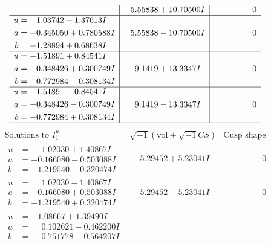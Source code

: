 \documentclass[1p]{elsarticle_modified}
\theoremstyle{definition}
\newcommand{\I}{\sqrt{-1}}
\begin{document}
$$\begin{array}{c|c|c}
 & \phantom{-}5.55838 + 10.70500 I & \phantom{-0.000000 } 0 \\ \hline\begin{aligned}
u &= \phantom{-}1.03742 - 1.37613 I \\
a &= -0.345050 + 0.780588 I \\
b &= -1.28894 + 0.68638 I\end{aligned}
 & \phantom{-}5.55838 - 10.70500 I & \phantom{-0.000000 } 0 \\ \hline\begin{aligned}
u &= -1.51891 + 0.84541 I \\
a &= -0.348426 + 0.300749 I \\
b &= -0.772984 - 0.308134 I\end{aligned}
 & \phantom{-}9.1419 + 13.3347 I & \phantom{-0.000000 } 0 \\ \hline\begin{aligned}
u &= -1.51891 - 0.84541 I \\
a &= -0.348426 - 0.300749 I \\
b &= -0.772984 + 0.308134 I\end{aligned}
 & \phantom{-}9.1419 - 13.3347 I & \phantom{-0.000000 } 0\\
 \hline 
 \end{array}$$\newpage$$\begin{array}{c|c|c}  
\text{Solutions to }I^u_{1}& \I (\text{vol} + \sqrt{-1}CS) & \text{Cusp shape}\\
 \hline 
\begin{aligned}
u &= \phantom{-}1.02030 + 1.40867 I \\
a &= -0.166080 - 0.503088 I \\
b &= -1.219540 - 0.320474 I\end{aligned}
 & \phantom{-}5.29452 + 5.23041 I & \phantom{-0.000000 } 0 \\ \hline\begin{aligned}
u &= \phantom{-}1.02030 - 1.40867 I \\
a &= -0.166080 + 0.503088 I \\
b &= -1.219540 + 0.320474 I\end{aligned}
 & \phantom{-}5.29452 - 5.23041 I & \phantom{-0.000000 } 0 \\ \hline\begin{aligned}
u &= -1.08667 + 1.39490 I \\
a &= \phantom{-}0.102621 - 0.462200 I \\
b &= \phantom{-}0.751778 - 0.564207 I\end{aligned}

\end{array}$$
\end{document}
